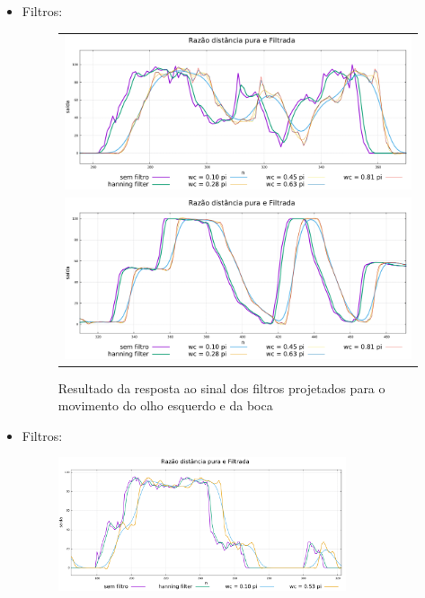 \documentclass[brazil]{beamer}
\begin{document}
\begin{frame}
  \begin{itemize}
      \item Filtros:
      \begin{figure}
\centering
\begin{tabular}{c}
\includegraphics[width=0.6\linewidth]{./img/filter-result-left-eye.pdf} \\
\includegraphics[width=0.6\linewidth]{./img/filter-result-open-mouth.pdf} \\
\end{tabular}
\caption{Resultado da resposta ao sinal dos filtros projetados para o movimento do olho esquerdo e da boca}
\end{figure}
              
  \end{itemize} 
\end{frame}

\begin{frame}
  \begin{itemize}
      \item Filtros:
	\begin{figure}
        \centering
        \includegraphics[width = 0.8\textwidth, keepaspectratio]{./img/filter-result-smile.pdf}
      \end{figure}
              
  \end{itemize} 
\end{frame}
\end{document}
